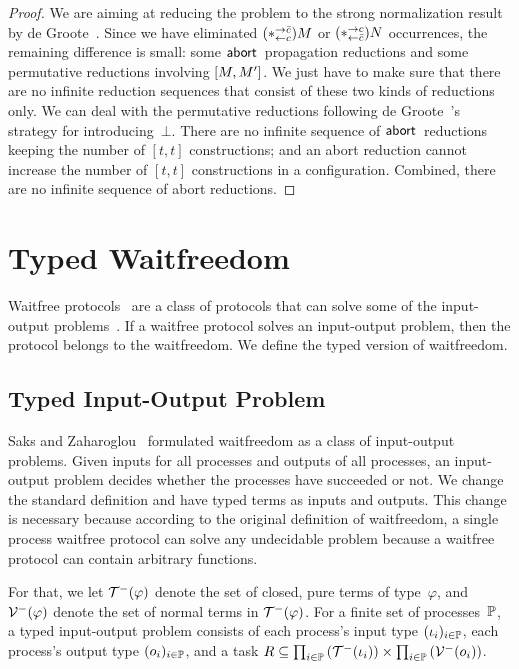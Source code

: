 {\begin{proof}
We are aiming at reducing the problem to the strong normalization result
by de Groote~\cite{Philippe2002js}.
Since we have eliminated $(\ast^{\rightarrow {\bar{c}}}_{\leftarrow{c}})M$ or $(\ast^{\rightarrow {c}}_{\leftarrow{\bar{c}}})N$ occurrences,
the remaining difference is small: some $\mathsf{abort\,}$ propagation reductions
 and some permutative reductions involving $[{M,M'}]$.
We just have to make sure that there are no infinite reduction sequences
that consist of these two kinds of reductions only.
We can deal with the permutative reductions following de
 Groote~\cite{Philippe2002js}'s strategy for introducing~$\bot$.
 There are no infinite sequence of $\mathsf{abort\,}$ reductions keeping the
 number of $[t,t]$ constructions; and an abort reduction cannot increase
 the number of $[t,t]$ constructions in a configuration.  Combined,
 there are no infinite sequence of abort reductions.
\end{proof}



\section{Typed Waitfreedom}
\label{waitfreedom}

Waitfree protocols~\cite{Herlihy88,Saks:1993vq} are a class of protocols
that can solve
some of the input-output problems~\cite{Moran:1987ep,Biran:1988hh}.
If a waitfree protocol solves an input-output problem, then the protocol
belongs to the waitfreedom.
We define the typed version of waitfreedom.

\subsection{Typed Input-Output Problem}

Saks and Zaharoglou~\cite{Saks:1993vq} formulated waitfreedom as a class
of input-output
problems.
Given inputs for all processes and outputs of all
processes, an input-output problem decides whether the processes have
succeeded or not.
We change the standard definition and have typed terms as inputs and
outputs.
This change is necessary because according to the original definition of
waitfreedom,
a single process waitfree protocol can solve any undecidable problem
because a waitfree protocol can contain arbitrary functions.

For that, we let $\mathcal{T}^-(\varphi)$ denote the set of closed, pure terms of
type~$\varphi$,
and $\mathcal{V}^-(\varphi)$ denote the set of normal terms in $\mathcal{T}^-(\varphi)$.
For a finite set of processes~$\mathbb{P}$,
a typed input-output problem consists
of each process's input type
$(\iota_i)_{i\in \mathbb{P}}$, each process's output type $(o_i)_{i\in
\mathbb{P}}$, and a
task $R\subseteq \prod_{i\in \mathbb{P}}\left(\mathcal{T}^-(\iota_i)\right)\times
 \prod_{i\in \mathbb{P}}\left(\mathcal{V}^-(o_i)\right)$.

}
